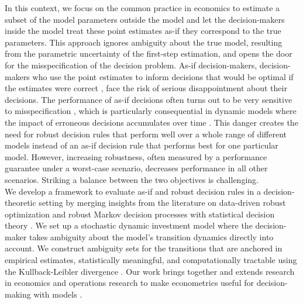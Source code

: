 {In this context, we focus on the common practice in economics to estimate a subset of the model parameters outside the model and let the decision-makers inside the model treat these point estimates as-if they correspond to the true parameters.
This approach ignores ambiguity about the true model, resulting from the parametric uncertainty of the first-step estimation, and opens the door for the misspecification of the decision problem. As-if decision-makers, decision-makers who use the point estimates to inform decisions that would be optimal if the estimates were correct \cite{Manski.2021}, face the risk of serious disappointment about their decisions. The performance of as-if decisions often turns out to be very sensitive to misspecification \cite{Smith.2006}, which is particularly consequential in dynamic models where the impact of erroneous decisions accumulates over time \cite{Mannor.2007}. This danger creates the need for robust decision rules that perform well over a whole range of different models instead of an as-if decision rule that performs best for one particular model. However, increasing robustness, often measured by a performance guarantee under a worst-case scenario, decreases performance in all other scenarios. Striking a balance between the two objectives is challenging.\\

We develop a framework to evaluate as-if and robust decision rules in a decision-theoretic setting by merging insights from the literature on data-driven robust optimization \cite{Bertsimas.2018} and robust Markov decision processes \cite{Ben-Tal.2009} with statistical decision theory \cite{Berger.2010}. We set up a stochastic dynamic investment model where the decision-maker takes ambiguity about the model's transition dynamics directly into account. We construct ambiguity sets for the transitions that are anchored in empirical estimates, statistically meaningful, and computationally tractable \cite{Ben-Tal.2013} using the Kullback-Leibler divergence \cite{Kullback.1951}. Our work brings together and extends research in economics and operations research to make econometrics useful for decision-making with models \cite{Manski.2021,Bertsimas.2006}.\\

}
